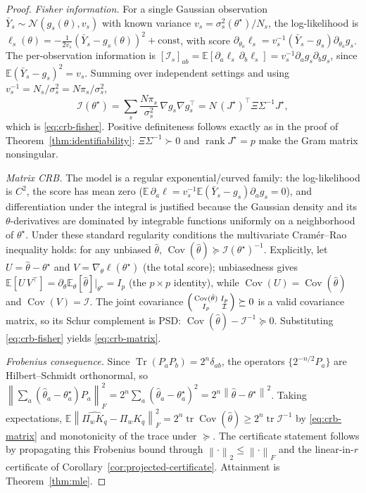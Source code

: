 \documentclass[aps,prresearch,reprint,superscriptaddress,nofootinbib,amsmath,amssymb]{revtex4-2}
\newcommand{\norm}[1]{\left\lVert #1 \right\rVert}
\newcommand{\Tr}{\operatorname{Tr}}
\begin{document}
\begin{proof}
\emph{Fisher information.} For a single Gaussian observation $\bar Y_s\sim\mathcal{N}(g_s(\theta),v_s)$ with known variance $v_s=\sigma_s^2(\theta^\star)/N_s$, the log-likelihood is $\ell_s(\theta)=-\tfrac1{2v_s}(\bar Y_s-g_s(\theta))^2+\text{const}$, with score $\partial_{\theta_a}\ell_s=v_s^{-1}(\bar Y_s-g_s)\partial_{\theta_a}g_s$. The per-observation information is $[\mathcal{I}_s]_{ab}=\mathbb{E}[\partial_a\ell_s\,\partial_b\ell_s]=v_s^{-1}\partial_ag_s\partial_bg_s$, since $\mathbb{E}(\bar Y_s-g_s)^2=v_s$. Summing over independent settings and using $v_s^{-1}=N_s/\sigma_s^2=N\pi_s/\sigma_s^2$,
\begin{equation*}
    \mathcal{I}(\theta^\star)=\sum_s\frac{N\pi_s}{\sigma_s^2}\,\nabla g_s\nabla g_s^\top=N\,(J^\star)^\top\Xi\Sigma^{-1}J^\star,
\end{equation*}
which is \eqref{eq:crb-fisher}. Positive definiteness follows exactly as in the proof of Theorem~\ref{thm:identifiability}: $\Xi\Sigma^{-1}\succ0$ and $\operatorname{rank}J^\star=p$ make the Gram matrix nonsingular.

\emph{Matrix CRB.} The model is a regular exponential/curved family: the log-likelihood is $C^2$, the score has mean zero ($\mathbb{E}\,\partial_a\ell=v_s^{-1}\mathbb{E}(\bar Y_s-g_s)\partial_ag_s=0$), and differentiation under the integral is justified because the Gaussian density and its $\theta$-derivatives are dominated by integrable functions uniformly on a neighborhood of $\theta^\star$. Under these standard regularity conditions the multivariate Cram\'er--Rao inequality holds: for any unbiased $\hat\theta$, $\operatorname{Cov}(\hat\theta)\succeq\mathcal{I}(\theta^\star)^{-1}$. Explicitly, let $U=\hat\theta-\theta^\star$ and $V=\nabla_\theta\ell(\theta^\star)$ (the total score); unbiasedness gives $\mathbb{E}[U\,V^\top]=\partial_\theta\mathbb{E}_\theta[\hat\theta]\big|_{\theta^\star}=I_p$ (the $p\times p$ identity), while $\operatorname{Cov}(U)=\operatorname{Cov}(\hat\theta)$ and $\operatorname{Cov}(V)=\mathcal{I}$. The joint covariance $\begin{psmallmatrix}\operatorname{Cov}(\hat\theta)&I_p\\ I_p&\mathcal{I}\end{psmallmatrix}\succeq0$ is a valid covariance matrix, so its Schur complement is PSD: $\operatorname{Cov}(\hat\theta)-\mathcal{I}^{-1}\succeq0$. Substituting \eqref{eq:crb-fisher} yields \eqref{eq:crb-matrix}.

\emph{Frobenius consequence.} Since $\Tr(P_aP_b)=2^n\delta_{ab}$, the operators $\{2^{-n/2}P_a\}$ are Hilbert--Schmidt orthonormal, so $\norm{\sum_a(\hat\theta_a-\theta_a^\star)P_a}_F^2=2^n\sum_a(\hat\theta_a-\theta_a^\star)^2=2^n\norm{\hat\theta-\theta^\star}^2$. Taking expectations, $\mathbb{E}\norm{\widehat{\Pi_wK_q}-\Pi_wK_q}_F^2=2^n\operatorname{tr}\operatorname{Cov}(\hat\theta)\geq2^n\operatorname{tr}\mathcal{I}^{-1}$ by \eqref{eq:crb-matrix} and monotonicity of the trace under $\succeq$. The certificate statement follows by propagating this Frobenius bound through $\norm{\cdot}_2\leq\norm{\cdot}_F$ and the linear-in-$r$ certificate of Corollary~\ref{cor:projected-certificate}. Attainment is Theorem~\ref{thm:mle}.
\end{proof}
\end{document}
